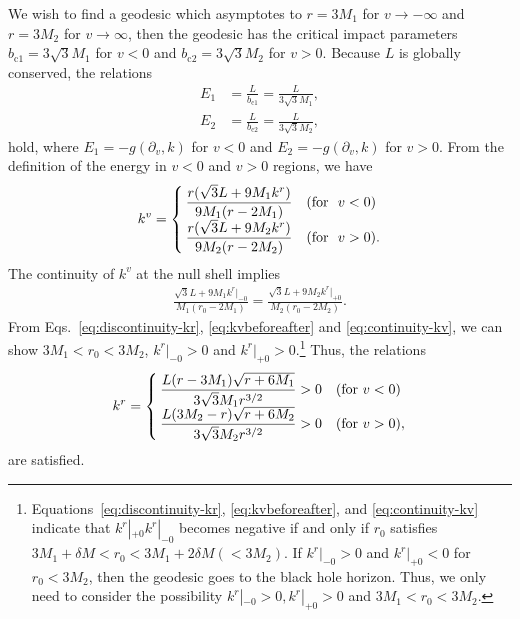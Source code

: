 \documentclass[prd,showpacs,preprintnumbers,groupedaddress,superscriptaddress,nofootinbib,11pt]{revtex4-1} %
\theoremstyle{newplain}
\newcommand{\mr}[1]{\mathrm{#1}}
\begin{document}
We wish to find a geodesic which asymptotes to $r=3 M_1$ for $v \to -\infty$ and $r=3 M_2$ for $v \to \infty$, then
the geodesic has the critical impact parameters $b_{\mr{c}1} = 3\sqrt{3}M_1$ for $v < 0$ and $b_{\mr{c}2} = 3\sqrt{3}M_2$ for $v>0$.
Because $L$ is globally conserved,
the relations
\begin{align}
E_1 &= \frac{L}{b_{\mr{c}1}} = \frac{L}{3\sqrt{3}M_1},
\\
E_2 &= \frac{L}{b_{\mr{c}2}} = \frac{L}{3\sqrt{3}M_2},
\end{align}
hold, where $E_1 = -g(\partial_v, k)$ for $v<0$ and $E_2 = -g(\partial_v, k)$ for $v>0$.
{}From the definition of the energy in $v<0$ and $v >0$ regions,
we have
\begin{align}
k^v =
\begin{cases}
\dfrac{r (\sqrt{3}L + 9 M_1 k^r)}{9M_1(r - 2 M_1) } & ({\rm for~~} v <0)
\\ 
\dfrac{r (\sqrt{3}L + 9 M_2 k^r)}{9M_2(r - 2 M_2) } & ({\rm for~~} v >0).
\end{cases}
\label{eq:kvbeforeafter}
\end{align}
The continuity of $k^v$ at the null shell implies
\begin{align}
\frac{\sqrt{3}L + 9 M_1 k^r|_{-0}}{M_1(r_0 - 2 M_1 )} 
= \frac{\sqrt{3}L + 9 M_2 k^r|_{+0}}{M_2(r_0 - 2 M_2)}.
\label{eq:continuity-kv}
\end{align}
From Eqs.~\eqref{eq:discontinuity-kr}, \eqref{eq:kvbeforeafter}
and \eqref{eq:continuity-kv}, we can show
$3 M_1 < r_0 < 3 M_2$, $k^r|_{-0}>0$ and $k^r|_{+0}>0$.\footnote{
Equations~\eqref{eq:discontinuity-kr}, \eqref{eq:kvbeforeafter},
and \eqref{eq:continuity-kv} indicate that
$k^r|_{+0}k^r|_{-0}$ becomes negative if and only if $r_0$ satisfies $3 M_1 +\delta M < r_0 < 3 M_1 + 2 \delta M (< 3 M_2)$.
If $k^r|_{-0}>0$ and $k^r|_{+0}<0$ for $r_0 < 3 M_2$, then the geodesic goes to the black hole horizon.
Thus, we only need to consider the possibility 
$k^r|_{-0}>0, k^r|_{+0}>0$ and $3 M_1 < r_0 < 3 M_2$.
}
Thus, the relations
\begin{align}
k^r =
\begin{cases}
\dfrac{L(r-3 M_1)\sqrt{r + 6 M_1}}{3\sqrt{3}M_1 r^{3/2}} > 0 & ({\rm for~} v <0)
\\ 
\dfrac{L(3 M_2 - r)\sqrt{r + 6 M_2}}{3\sqrt{3}M_2r^{3/2}} > 0 & ({\rm for~} v >0),
\end{cases}
\label{eq:krbeforeafter}
\end{align}
are satisfied.
\end{document}
